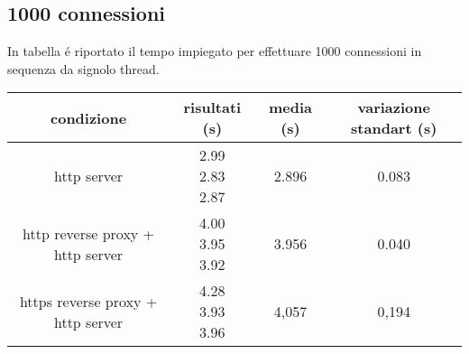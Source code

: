   \subsection{1000 connessioni}
  In tabella é riportato il tempo impiegato per effettuare 1000 connessioni in sequenza da signolo thread.
  \begin{center}
    \begin{tabular}{|c|c|c|c|}
      \hline
      condizione & risultati (s) & media (s) & variazione standart (s) \\
      \hline
      \hline
      http server & \makecell {2.99 \\ 2.83 \\ 2.87} & 2.896 & 0.083 \\
      \hline
      http reverse proxy + http server & \makecell {4.00 \\ 3.95 \\ 3.92} & 3.956 & 0.040 \\
      \hline
      https reverse proxy + http server & \makecell {4.28 \\ 3.93 \\ 3.96} & 4,057 & 0,194 \\
      \hline
    \end{tabular}

  \end{center}

